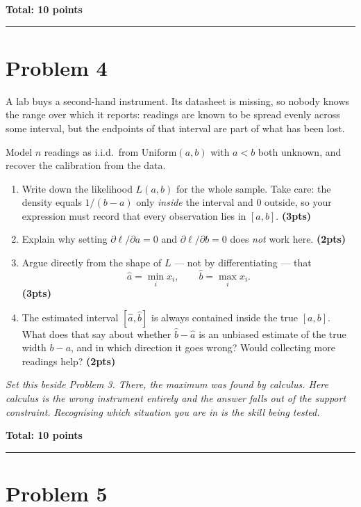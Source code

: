 \documentclass[11pt,a4paper]{article}
\newcommand{\pts}[1]{\hfill\textbf{(#1pts)}}
\newcommand{\total}[1]{\par\medskip\noindent\textbf{Total: #1 points}}
\newenvironment{parts}
  {\begin{enumerate}\setlength{\itemsep}{0.45em}\setlength{\parskip}{0pt}}
  {\end{enumerate}}
\begin{document}
\total{10}

\bigskip
\hrule
\bigskip

\section*{Problem 4}

A lab buys a second-hand instrument. Its datasheet is missing, so nobody knows
the range over which it reports: readings are known to be spread evenly across
some interval, but the endpoints of that interval are part of what has been lost.

Model $n$ readings as i.i.d.\ from $\mathrm{Uniform}(a,b)$ with $a < b$ both
unknown, and recover the calibration from the data.

\begin{parts}
  \item Write down the likelihood $L(a,b)$ for the whole sample. Take care: the
        density equals $1/(b-a)$ only \emph{inside} the interval and $0$ outside,
        so your expression must record that every observation lies in $[a,b]$.
        \pts{3}
  \item Explain why setting $\partial \ell/\partial a = 0$ and
        $\partial \ell/\partial b = 0$ does \emph{not} work here. \pts{2}
  \item Argue directly from the shape of $L$ — not by differentiating — that
        \[
          \hat a = \min_i x_i, \qquad \hat b = \max_i x_i .
        \]
        \pts{3}
  \item The estimated interval $[\hat a, \hat b]$ is always contained inside the
        true $[a,b]$. What does that say about whether $\hat b - \hat a$ is an
        unbiased estimate of the true width $b-a$, and in which direction it goes
        wrong? Would collecting more readings help? \pts{2}
\end{parts}

\noindent\textit{Set this beside Problem 3. There, the maximum was found by
calculus. Here calculus is the wrong instrument entirely and the answer falls out
of the support constraint. Recognising which situation you are in is the skill
being tested.}

\total{10}

\bigskip
\hrule
\bigskip

\section*{Problem 5}
\end{document}

